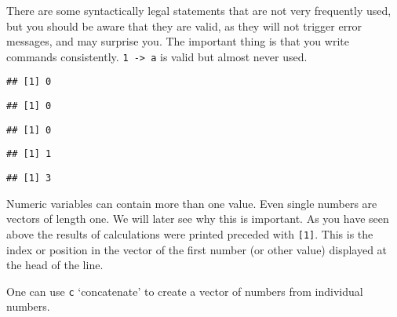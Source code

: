 \documentclass[paper=a4,10pt,div=17,headsepline,BCOR=12mm,twoside,open=right]{scrbook}\usepackage{knitr}
\begin{document}
There are some syntactically legal statements that are not very frequently used, but you should be aware that they are valid, as they will not trigger error messages, and may surprise you. The important thing is that you write commands consistently. \texttt{1 -> a} is valid but almost never used.

\begin{knitrout}\footnotesize
{}\color{fgcolor}\begin{kframe}
\begin{alltt}
 \hlkwb{<-}  \hlkwb{<-}  \hlkwb{<-} 
\end{alltt}
\begin{verbatim}
## [1] 0
\end{verbatim}
\begin{alltt}
\end{alltt}
\begin{verbatim}
## [1] 0
\end{verbatim}
\begin{alltt}
\end{alltt}
\begin{verbatim}
## [1] 0
\end{verbatim}
\begin{alltt}
 \hlkwb{->} 
\end{alltt}
\begin{verbatim}
## [1] 1
\end{verbatim}
\begin{alltt}
 \hlkwb{=} 
\end{alltt}
\begin{verbatim}
## [1] 3
\end{verbatim}
\end{kframe}
\end{knitrout}

Numeric variables can contain more than one value. Even single numbers are vectors of length one. We will later see why this is important. As you have seen above the results of calculations were printed preceded with \texttt{[1]}. This is the index or position in the vector of the first number (or other value) displayed at the head of the line.

One can use \texttt{c} `concatenate' to create a vector of numbers from individual numbers.
\end{document}
